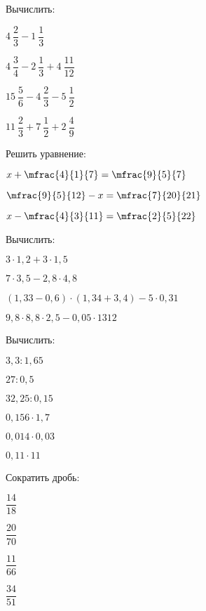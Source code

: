\begin{listofex}
	\item Вычислить:
	\begin{enumcols}[itemcolumns=2]
		\item \( 4\:\dfrac{2}{3}-1\:\dfrac{1}{3} \)
		\item \( 4\:\dfrac{3}{4}-2\:\dfrac{1}{3}+4\:\dfrac{11}{12} \)
		\item \( 15\:\dfrac{5}{6}-4\:\dfrac{2}{3}-5\:\dfrac{1}{2} \)
		\item \( 11\:\dfrac{2}{3}+7\:\dfrac{1}{2}+2\:\dfrac{4}{9} \)
	\end{enumcols}
	\item Решить уравнение:
	\begin{enumcols}[itemcolumns=3]
		\item \( x+\mfrac{4}{1}{7}=\mfrac{9}{5}{7} \)
		\item \( \mfrac{9}{5}{12}-x=\mfrac{7}{20}{21} \)
		\item \( x-\mfrac{4}{3}{11}=\mfrac{2}{5}{22} \)
	\end{enumcols}
	\item Вычислить:
	\begin{enumcols}[itemcolumns=2]
		\item \( 3\cdot1,2+3\cdot1,5 \)
		\item \( 7\cdot3,5-2,8\cdot4,8 \)
		\item \( (1,33-0,6)\cdot(1,34+3,4)-5\cdot0,31 \)
		\item \( 9,8\cdot8,8\cdot2,5-0,05\cdot1312 \)
	\end{enumcols}
	\item Вычислить:
	\begin{enumcols}[itemcolumns=3]
		\item \( 3,3:1,65 \)
		\item \( 27:0,5 \)
		\item \( 32,25:0,15 \)
		\item \( 0,156\cdot1,7 \)
		\item \( 0,014\cdot0,03 \)
		\item \( 0,11\cdot 11 \)
	\end{enumcols}
	\item Сократить дробь:
	\begin{enumcols}[itemcolumns=6]
		\item \(\dfrac{14}{18}\)
		\item \(\dfrac{20}{70} \)
		\item \(\dfrac{11}{66} \)
		\item \(\dfrac{34}{51} \)

\end{enumcols}
\end{listofex}
